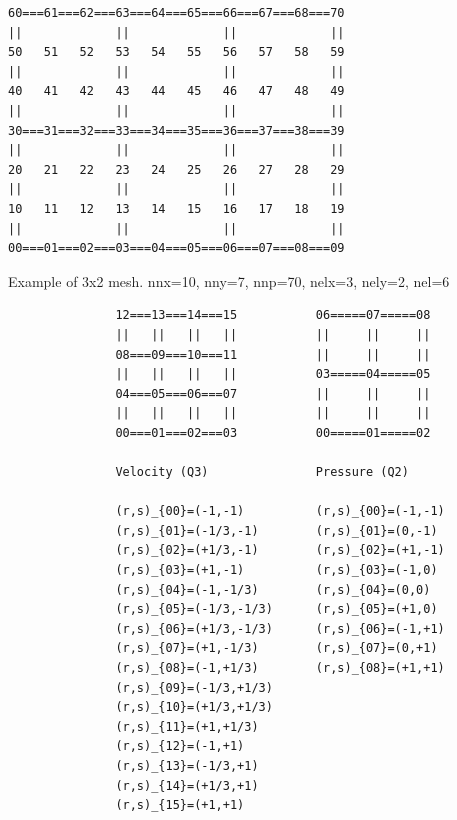 \begin{center}
\begin{verbatim}
60===61===62===63===64===65===66===67===68===70
||             ||             ||             ||
50   51   52   53   54   55   56   57   58   59
||             ||             ||             ||
40   41   42   43   44   45   46   47   48   49
||             ||             ||             ||
30===31===32===33===34===35===36===37===38===39
||             ||             ||             ||
20   21   22   23   24   25   26   27   28   29
||             ||             ||             ||
10   11   12   13   14   15   16   17   18   19
||             ||             ||             ||
00===01===02===03===04===05===06===07===08===09
\end{verbatim}
{\captionfont Example of 3x2 mesh. nnx=10, nny=7, nnp=70, nelx=3, nely=2, nel=6}
\end{center}

\newpage
\begin{footnotesize}
\begin{verbatim}
               12===13===14===15           06=====07=====08
               ||   ||   ||   ||           ||     ||     ||
               08===09===10===11           ||     ||     ||
               ||   ||   ||   ||           03=====04=====05
               04===05===06===07           ||     ||     ||
               ||   ||   ||   ||           ||     ||     ||
               00===01===02===03           00=====01=====02

               Velocity (Q3)               Pressure (Q2)

               (r,s)_{00}=(-1,-1)          (r,s)_{00}=(-1,-1) 
               (r,s)_{01}=(-1/3,-1)        (r,s)_{01}=(0,-1) 
               (r,s)_{02}=(+1/3,-1)        (r,s)_{02}=(+1,-1) 
               (r,s)_{03}=(+1,-1)          (r,s)_{03}=(-1,0) 
               (r,s)_{04}=(-1,-1/3)        (r,s)_{04}=(0,0) 
               (r,s)_{05}=(-1/3,-1/3)      (r,s)_{05}=(+1,0) 
               (r,s)_{06}=(+1/3,-1/3)      (r,s)_{06}=(-1,+1) 
               (r,s)_{07}=(+1,-1/3)        (r,s)_{07}=(0,+1) 
               (r,s)_{08}=(-1,+1/3)        (r,s)_{08}=(+1,+1) 
               (r,s)_{09}=(-1/3,+1/3)
               (r,s)_{10}=(+1/3,+1/3)
               (r,s)_{11}=(+1,+1/3)
               (r,s)_{12}=(-1,+1)
               (r,s)_{13}=(-1/3,+1)
               (r,s)_{14}=(+1/3,+1)
               (r,s)_{15}=(+1,+1)
\end{verbatim}
\end{footnotesize}


